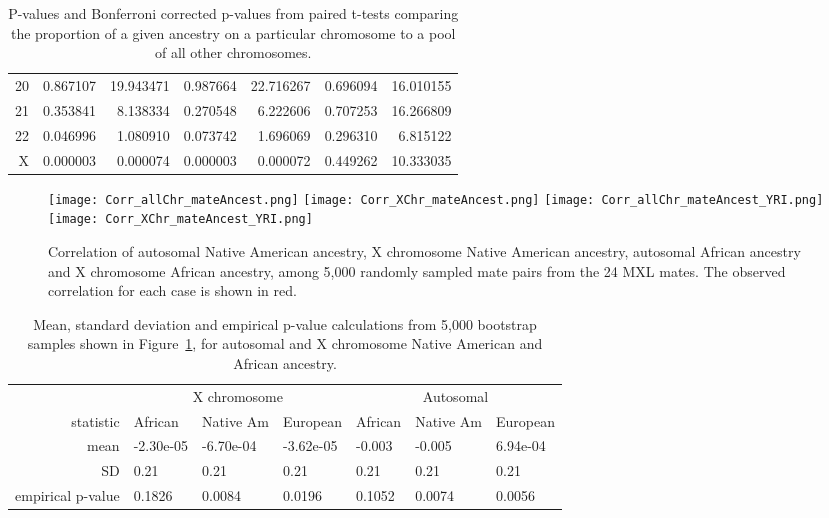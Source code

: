 \documentclass[11pt]{article} %
\begin{document}
\begin{table}[ht]
\begin{center}
\begin{tabular}{r|rr|rr|rr}
  20 & 0.867107 & 19.943471 & 0.987664 & 22.716267 & 0.696094 & 16.010155 \\ 
  21 & 0.353841 & 8.138334 & 0.270548 & 6.222606 & 0.707253 & 16.266809 \\ 
  22 & 0.046996 & 1.080910 & 0.073742 & 1.696069 & 0.296310 & 6.815122 \\ 
  X & 0.000003 & 0.000074 & 0.000003 & 0.000072 & 0.449262 & 10.333035 \\ 
   \hline
\end{tabular}
\end{center}
\caption{P-values and Bonferroni corrected p-values from paired t-tests comparing the proportion of a given ancestry on a particular chromosome to a pool of all other chromosomes.}
\end{table}

\begin{figure}
\centering
\texttt{[image: Corr\_allChr\_mateAncest.png]}
\texttt{[image: Corr\_XChr\_mateAncest.png]}
\texttt{[image: Corr\_allChr\_mateAncest\_YRI.png]}
\texttt{[image: Corr\_XChr\_mateAncest\_YRI.png]}
\caption{Correlation of autosomal Native American ancestry, X chromosome Native American ancestry, autosomal African ancestry and X chromosome African ancestry, among 5,000 randomly sampled mate pairs from the 24 MXL mates.
The observed correlation for each case is shown in red.}
\label{fig:hists}
\end{figure}

\begin{table}[ht]
\begin{center}
\begin{tabular}{r|lll|lll}
\hline
&\multicolumn{3}{c|}{X chromosome}&\multicolumn{3}{|c}{Autosomal}\\
statistic& African & Native Am &European& African & Native Am&European \\ \hline
mean & -2.30e-05 &-6.70e-04 &-3.62e-05&-0.003 & -0.005 &6.94e-04\\
SD & 0.21 &0.21 &0.21&0.21 & 0.21&0.21 \\
empirical p-value &0.1826 &  0.0084 &0.0196& 0.1052 & 0.0074 &0.0056 \\
\end{tabular} \end{center} 
\caption{Mean, standard deviation and empirical p-value calculations from 5,000 bootstrap samples shown in Figure~\ref{fig:hists}, for autosomal and X chromosome Native American and African ancestry.}
\end{table}
\end{document}
